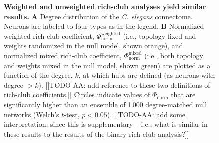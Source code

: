 \documentclass[10pt,letterpaper]{article}
\begin{document}
{\begin{figure}[h]
    \caption{
    \textbf{Weighted and unweighted rich-club analyses yield similar results.}
    \textbf{A} Degree distribution of the \emph{C. elegans} connectome.
    Neurons are labeled to four types as in the legend.
    \textbf{B}
    Normalized weighted rich-club coefficient, $\Phi_\mathrm{norm}^\mathrm{weighted}$ (i.e., topology fixed and weights randomized in the null model, shown orange), and
    normalized mixed rich-club coefficient, $\Phi_\mathrm{norm}^\mathrm{mixed}$ (i.e., both topology and weights mixed in the null model, shown green) are plotted as a function of the degree, $k$, at which hubs are defined (as neurons with degree $>k$).
    [[TODO-AA: add reference to these two definitions of rich-club coefficients.]]
    Circles indicate values of $\Phi_\mathrm{norm}$ that are significantly higher than an ensemble of 1\,000 degree-matched null networks (Welch's $t$-test, $p < 0.05$).
    [[TODO-AA: add some interpretation, since this is supplementary -- i.e., what is similar in these results to the results of the binary rich-club analysis?]]
\label{fig:S_weightedRC}
}
\end{figure}




}
\end{document}
